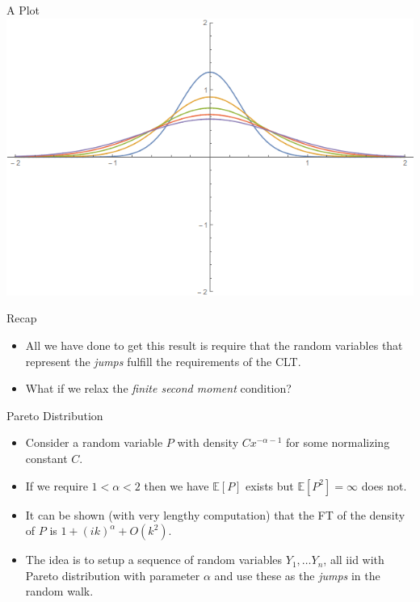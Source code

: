 \documentclass[pdf]{beamer}
\begin{document}
\begin{frame}{A Plot}
    \includegraphics[scale=0.4]{Diffusion}
\end{frame}

\begin{frame}{Recap}
    \begin{itemize}
        \item All we have done to get this result is require that the random variables that represent the \emph{jumps} fulfill the requirements of the CLT.
        \item What if we relax the \emph{finite second moment} condition?
    \end{itemize}
\end{frame}
\begin{frame}{Pareto Distribution}
    \begin{itemize}
        \item Consider a random variable $ P $ with density $ Cx^{-\alpha-1} $ for some normalizing constant $ C $.
        \item If we require $ 1 < \alpha < 2 $ then we have $ \mathbb{E}[P] $ exists but $ \mathbb{E}[P^2] = \infty $ does not.
        \item It can be shown (with very lengthy computation) that the FT of the density of $ P $ is $ 1 + (ik)^\alpha + O(k^2) $.
        \item The idea is to setup a sequence of random variables $ Y_1, \ldots Y_n $, all iid with Pareto distribution with parameter $ \alpha $ and use these as the \emph{jumps} in the random walk.
    \end{itemize}
    
\end{frame}
\end{document}

